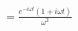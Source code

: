 \documentclass[preview]{standalone}
\begin{document}
\begin{align*}
=\frac{e^{-i\omega t}(1+i\omega t)}{\omega^{2}}
\end{align*}
\end{document}
